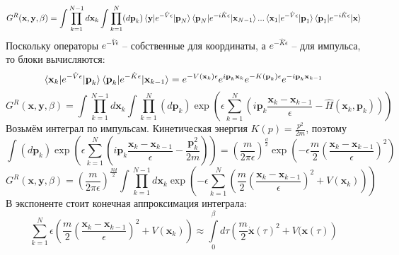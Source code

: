 \documentclass[12pt]{article}
\theoremstyle{definition}
\begin{document}
\begin{equation*}
    G^R(\textbf{x},\textbf{y},\beta)=\int\prod\limits_{k=1}^{N-1}d\textbf{x}_k\int\prod_{k=1}^N(d\textbf{p}_k)\braket{\textbf{y}|e^{-\hat{V}\epsilon}|\textbf{p}_N}\braket{\textbf{p}_N|e^{-i\hat{K}\epsilon}|\textbf{x}_{N-1}}...\braket{\textbf{x}_1|e^{-\hat{V}\epsilon}|\textbf{p}_1}\braket{\textbf{p}_1|e^{-i\hat{K}\epsilon}|\textbf{x}}
\end{equation*}
Поскольку операторы $e^{-\hat{V}\epsilon}$ -- собственные для координаты, а $e^{-\hat{K}\epsilon}$ -- для импульса, то блоки вычисляются:
\begin{equation}
    \braket{\textbf{x}_k|e^{-\hat{V}\epsilon}|\textbf{p}_k}\braket{\textbf{p}_k|e^{-\hat{K}\epsilon}|\textbf{x}_{k-1}}=e^{-V(\textbf{x}_k)\epsilon}e^{i\textbf{p}_k\textbf{x}_k}e^{-K(\textbf{p}_k)\epsilon}e^{-i\textbf{p}_k\textbf{x}_{k-1}}
\end{equation}
\begin{equation}
    G^R(\textbf{x},\textbf{y},\beta)=\int\prod\limits_{k=1}^{N-1}d\textbf{x}_k\int\prod\limits_{k=1}^N(d\textbf{p}_k)\exp\left(\epsilon\sum\limits_{k=1}^N\left(i\textbf{p}_k\frac{\textbf{x}_k-\textbf{x}_{k-1}}{\epsilon}-\hat{H}(\textbf{x}_k,\textbf{p}_k)\right)\right)
\end{equation}
Возьмём интеграл по импульсам. Кинетическая энергия $K(p)=\frac{p^2}{2m}$, поэтому
\begin{equation}
    \int(d\textbf{p}_k)\exp\left(\epsilon\sum\limits_{k=1}^N\left(i\textbf{p}_k\frac{\textbf{x}_k-\textbf{x}_{k-1}}{\epsilon}-\frac{\textbf{p}_k^2}{2m}\right)\right)=\left(\frac{m}{2\pi\epsilon}\right)^\frac{d}{2}\exp\left(-\epsilon\frac{m}{2}\left(\frac{\textbf{x}_k-\textbf{x}_{k-1}}{\epsilon}\right)^2\right)
\end{equation}
\begin{equation}
    G^R(\textbf{x},\textbf{y},\beta)=\left(\frac{m}{2\pi\epsilon}\right)^\frac{Nd}{2}\int\prod\limits_{k=1}^{N-1}d\textbf{x}_k\exp\left(-\epsilon\sum\limits_{k=1}^N\left(\frac{m}{2}\left(\frac{\textbf{x}_k-\textbf{x}_{k-1}}{\epsilon}\right)^2+V(\textbf{x}_k)\right)\right)
\end{equation}
В экспоненте стоит конечная аппроксимация интеграла:
\begin{equation}
    \sum\limits_{k=1}^N\epsilon\left(\frac{m}{2}\left(\frac{\textbf{x}_k-\textbf{x}_{k-1}}{\epsilon}\right)^2+V(\textbf{x}_k)\right)\approx\int\limits_0^\beta d\tau\left(\frac{m}{2}\dot{\textbf{x}}(\tau)^2+V(\textbf{x}(\tau)\right)
\end{equation}
\end{document}
